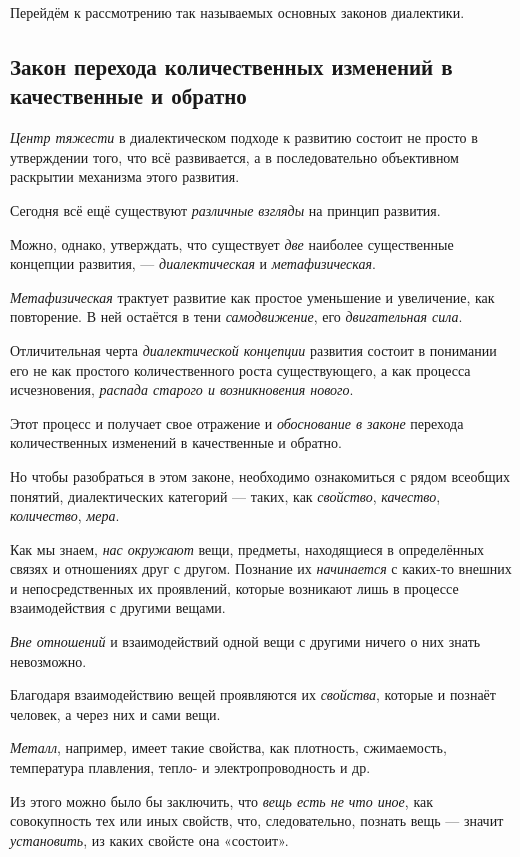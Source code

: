 \documentclass[a4paper,14pt,russian]{extreport}
\begin{document}
Перейдём к рассмотрению так называемых основных законов диалектики.

\subsection{Закон перехода количественных изменений в качественные и обратно}

\emph{Центр тяжести} в диалектическом подходе к развитию состоит не просто в утверждении того, что всё развивается, а в последовательно объективном раскрытии механизма этого развития.

Сегодня всё ещё существуют \emph{различные взгляды} на принцип развития.

Можно, однако, утверждать, что существует \emph{две} наиболее существенные концепции развития, --- \emph{диалектическая} и \emph{метафизическая}.

\emph{Метафизическая} трактует развитие как простое уменьшение и увеличение, как повторение. В ней остаётся в тени \emph{самодвижение}, его \emph{двигательная сила}.

Отличительная черта \emph{диалектической концепции} развития состоит в понимании его не как простого количественного роста существующего, а как процесса исчезновения, \emph{распада старого и возникновения нового}.

Этот процесс и получает свое отражение и \emph{обоснование в законе} перехода количественных изменений в качественные и обратно.

Но чтобы разобраться в этом законе, необходимо ознакомиться с рядом всеобщих понятий, диалектических категорий --- таких, как \emph{свойство}, \emph{качество}, \emph{количество}, \emph{мера}.

Как мы знаем, \emph{нас окружают} вещи, предметы, находящиеся в определённых связях и отношениях друг с другом. Познание их \emph{начинается} с каких-то внешних и непосредственных их проявлений, которые возникают лишь в процессе взаимодействия с другими вещами.

\emph{Вне отношений} и взаимодействий одной вещи с другими ничего о них знать невозможно.

Благодаря взаимодействию вещей проявляются их \emph{свойства}, которые и познаёт человек, а через них и сами вещи.

\emph{Металл}, например, имеет такие свойства, как плотность, сжимаемость, температура плавления, тепло- и электропроводность и др.

Из этого можно было бы заключить, что \emph{вещь есть не что иное}, как совокупность тех или иных свойств, что, следовательно, познать вещь --- значит \emph{установить}, из каких свойсте она «состоит».
\end{document}
